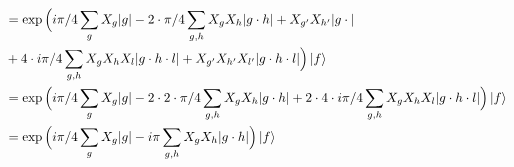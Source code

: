\documentclass[manuscript,screen,review]{acmart}
\begin{document}
\begin{equation*}
  \begin{split}
    & = \exp \Big( i\pi/4 \sum_{g} X_{g}|g|  -  2 \cdot \pi/4 \sum_{g,h} X_{g}X_{h}|g\cdot h| + X_{g^{\prime}}X_{h^{\prime}}|g\cdot|  \\
    & +  4 \cdot i\pi/4 \sum_{g,h} X_{g}X_{h}X_{l}|g\cdot h \cdot l| + X_{g^{\prime}}X_{h^{\prime}}X_{l^{\prime}}|g\cdot h \cdot l| \Big) \ket{f} \\
    & = \exp \Big( i\pi/4 \sum_{g} X_{g}|g|  -  2 \cdot 2 \cdot \pi/4 \sum_{g,h} X_{g}X_{h}|g\cdot h| +  2 \cdot 4 \cdot i\pi/4 \sum_{g,h} X_{g}X_{h}X_{l}|g\cdot h \cdot l| \Big) \ket{f} \\
    & = \exp \Big( i\pi/4 \sum_{g} X_{g}|g|  -  i\pi \sum_{g,h} X_{g}X_{h}|g\cdot h|  \Big) \ket{f} 
  \end{split}
\end{equation*}
\end{document}
